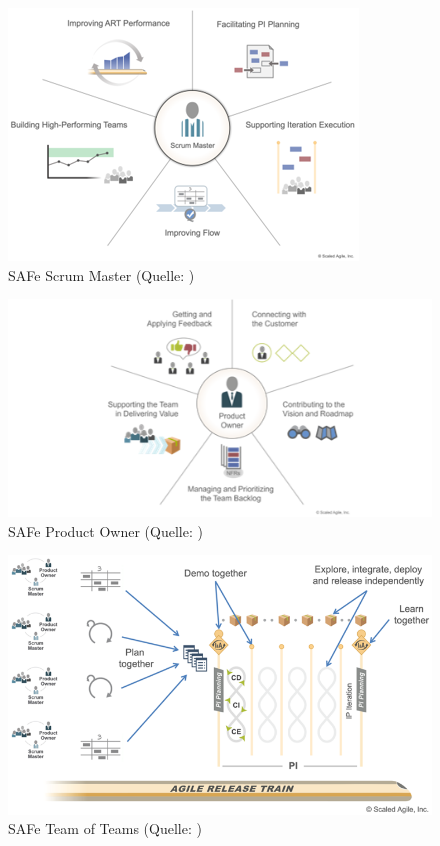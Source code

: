 \begin{figure}[htb]
	\centering
	\includegraphics[width=\textwidth]{img/ScrumMaster.png}
	\caption[SAFe Scrum Master (Quelle: \cite{SAFe})]{SAFe Scrum Master (Quelle: \cite{SAFe})}
	\label{fig:SAFeScrumMaster}
\end{figure}

\begin{figure}[htb]
	\centering
	\includegraphics[width=\textwidth]{img/ProductOwner.png}
	\caption[SAFe Product Owner (Quelle: \cite{SAFe})]{SAFe Product Owner (Quelle: \cite{SAFe})}
	\label{fig:SAFeProductOwner}
\end{figure}

\begin{figure}[htb]
	\centering
	\includegraphics[width=\textwidth]{img/TeamOfTeams.png}
	\caption[SAFe Team of Teams (Quelle: \cite{SAFe})]{SAFe Team of Teams (Quelle: \cite{SAFe})}
	\label{fig:SAFeTeamOfTeams}
\end{figure}

